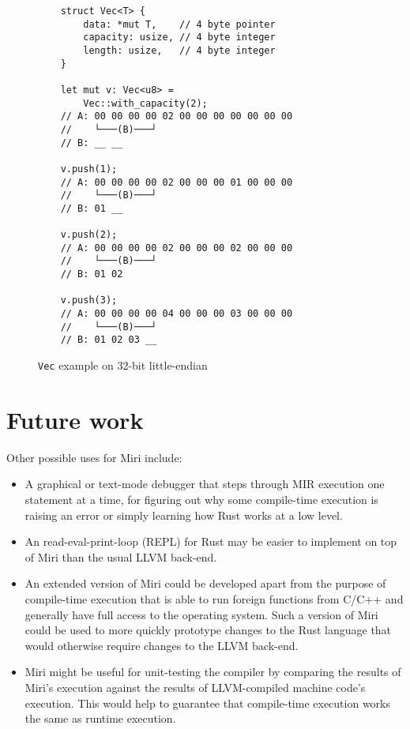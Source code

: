 \documentclass[twocolumn]{article}
\newcommand{\rust}[1]{\texttt{#1}}
\begin{document}
\begin{figure}[t]
  \begin{verbatim}
    struct Vec<T> {
        data: *mut T,    // 4 byte pointer
        capacity: usize, // 4 byte integer
        length: usize,   // 4 byte integer
    }

    let mut v: Vec<u8> =
        Vec::with_capacity(2);
    // A: 00 00 00 00 02 00 00 00 00 00 00 00
    //    └───(B)───┘
    // B: __ __

    v.push(1);
    // A: 00 00 00 00 02 00 00 00 01 00 00 00
    //    └───(B)───┘
    // B: 01 __

    v.push(2);
    // A: 00 00 00 00 02 00 00 00 02 00 00 00
    //    └───(B)───┘
    // B: 01 02

    v.push(3);
    // A: 00 00 00 00 04 00 00 00 03 00 00 00
    //    └───(B)───┘
    // B: 01 02 03 __
  \end{verbatim}
  \caption{\rust{Vec} example on 32-bit little-endian}
\end{figure}


\section{Future work}

Other possible uses for Miri include:

\begin{itemize}
  \item A graphical or text-mode debugger that steps through MIR execution one statement at a time,
    for figuring out why some compile-time execution is raising an error or simply learning how Rust
    works at a low level.
  \item An read-eval-print-loop (REPL) for Rust may be easier to implement on top of Miri than the
    usual LLVM back-end.
  \item An extended version of Miri could be developed apart from the purpose of compile-time
    execution that is able to run foreign functions from C/C++ and generally have full access to the
    operating system. Such a version of Miri could be used to more quickly prototype changes to the
    Rust language that would otherwise require changes to the LLVM back-end.
  \item Miri might be useful for unit-testing the compiler by comparing the results of Miri's
    execution against the results of LLVM-compiled machine code's execution. This would help to
    guarantee that compile-time execution works the same as runtime execution.
\end{itemize}
\end{document}
